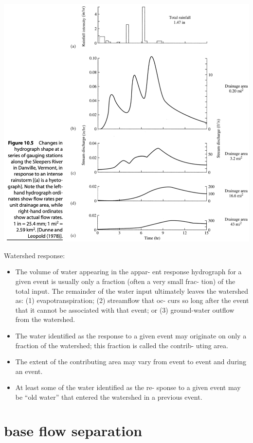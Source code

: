 \documentclass[
  letterpaper,
  DIV=11,
  numbers=noendperiod]{scrreprt}
\providecommand{\tightlist}{%
  \setlength{\itemsep}{0pt}\setlength{\parskip}{0pt}}\usepackage{longtable,booktabs,array}
\begin{document}
\includegraphics{archive/figures/dingman-figure10.5.png}

Watershed response:

\begin{itemize}
\tightlist
\item
  The volume of water appearing in the appar- ent response hydrograph
  for a given event is usually only a fraction (often a very small frac-
  tion) of the total input. The remainder of the water input ultimately
  leaves the watershed as: (1) evapotranspiration; (2) streamflow that
  oc- curs so long after the event that it cannot be associated with
  that event; or (3) ground-water outflow from the watershed.
\item
  The water identified as the response to a given event may originate on
  only a fraction of the watershed; this fraction is called the contrib-
  uting area.
\item
  The extent of the contributing area may vary from event to event and
  during an event.
\item
  At least some of the water identified as the re- sponse to a given
  event may be ``old water'' that entered the watershed in a previous
  event.
\end{itemize}

\hypertarget{base-flow-separation}{%
\section{base flow separation}\label{base-flow-separation}}
\end{document}
